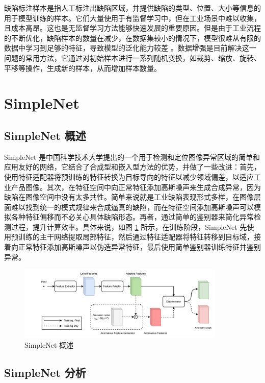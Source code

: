 \documentclass[
  ]{njuthesis}
\begin{document}
缺陷标注样本是指人工标注出缺陷区域，并提供缺陷的类型、位置、大小等信息的用于模型训练的样本。它们大量使用于有监督学习中，但在工业场景中难以收集，且成本高昂。这也是无监督学习方法能够快速发展的重要原因。但是由于工业流程的不断优化，缺陷样本的数量在减少，在数据集较小的情况下，模型很难从有限的数据中学习到足够的特征，导致模型的泛化能力较差 \cite{[12]}。数据增强是目前解决这一问题的常用方法，它通过对初始样本进行一系列随机变换，如裁剪、缩放、旋转、平移等操作，生成新的样本，从而增加样本数量。

\section{SimpleNet}

\subsection{SimpleNet 概述}

SimpleNet\cite{[13]} 是中国科学技术大学提出的一个用于检测和定位图像异常区域的简单和应用友好的网络，它结合了合成型和嵌入型方法的优势，并做了一些改进：首先，使用特征适配器将预训练的特征转换为目标导向的特征以减少领域偏差，以适应工业产品图像。其次，在特征空间中向正常特征添加高斯噪声来生成合成异常，因为缺陷在图像空间中没有太多共性。简单来说就是工业缺陷表现形式多样，在图像层面难以找到统一的模式规律来合成逼真的缺陷，而在特征空间添加高斯噪声可以模拟各种特征偏移而不必关心具体缺陷形态。再者，通过简单的鉴别器来简化异常检测过程，提升计算效率。具体来说，如图 \ref{SimpleNet} 所示，在训练阶段，SimpleNet 先使用预训练的主干网络提取局部特征，然后通过特征适配器将特征转移到目标域，接着向正常特征添加高斯噪声以伪造异常特征，最后使用简单鉴别器训练特征并鉴别异常。

\begin{figure}[ht]
    \centering
    \includegraphics[width=0.88\textwidth]{images/SimpleNet概述.png}
    \caption{SimpleNet 概述}
    \label{SimpleNet}
\end{figure}

\subsection{SimpleNet 分析}
\end{document}
